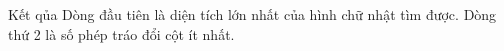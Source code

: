 Kết qủa  
Dòng đầu tiên là diện tích lớn nhất của hình chữ nhật tìm được. Dòng thứ 2 là số phép tráo đổi cột ít nhất.